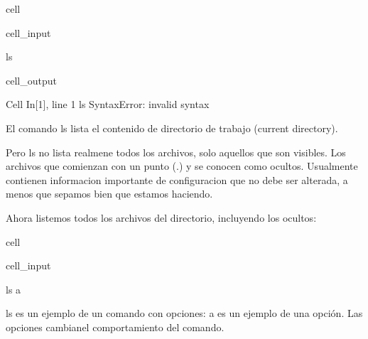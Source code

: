 \documentclass[letterpaper,10pt,english]{jupyterBook}
\begin{document}
\begin{sphinxuseclass}{cell}\begin{sphinxVerbatimInput}

\begin{sphinxuseclass}{cell_input}
\begin{sphinxVerbatim}[commandchars=\\\{\}]
\PYGZdl{} ls
\end{sphinxVerbatim}

\end{sphinxuseclass}\end{sphinxVerbatimInput}
\begin{sphinxVerbatimOutput}

\begin{sphinxuseclass}{cell_output}
\begin{sphinxVerbatim}[commandchars=\\\{\}]
  Cell In[1], line 1
    \PYGZdl{} ls
    \PYGZca{}
SyntaxError: invalid syntax
\end{sphinxVerbatim}

\end{sphinxuseclass}\end{sphinxVerbatimOutput}

\end{sphinxuseclass}
\sphinxAtStartPar
El comando ls lista el contenido de directorio de trabajo (current directory).

\sphinxAtStartPar
Pero ls no lista realmene todos los archivos, solo aquellos que son visibles. Los archivos que comienzan con un punto (.) y se conocen como ocultos. Usualmente contienen informacion importante de configuracion que no debe ser alterada, a menos que sepamos bien que estamos haciendo.

\sphinxAtStartPar
Ahora listemos todos los archivos del directorio, incluyendo los ocultos:

\begin{sphinxuseclass}{cell}\begin{sphinxVerbatimInput}

\begin{sphinxuseclass}{cell_input}
\begin{sphinxVerbatim}[commandchars=\\\{\}]
\PYGZdl{} ls \PYGZhy{}a
\end{sphinxVerbatim}

\end{sphinxuseclass}\end{sphinxVerbatimInput}

\end{sphinxuseclass}
\sphinxAtStartPar
ls es un ejemplo de un comando con opciones: \sphinxhyphen{}a es un ejemplo de una opción. Las opciones cambianel comportamiento del comando.
\end{document}
